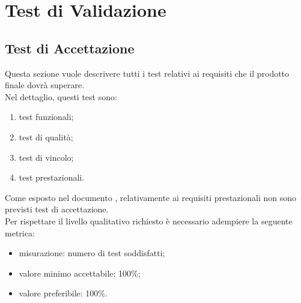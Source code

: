 \section{Test di Validazione}

\subsection{Test di Accettazione}
	Questa sezione vuole descrivere tutti i test relativi ai requisiti che il prodotto finale dovrà superare.\\
	Nel dettaglio, questi test sono:
	\begin{enumerate}
		\item test funzionali;
		\item test di qualità;
		\item test di vincolo;
		\item test prestazionali.
	\end{enumerate}
	Come esposto nel documento \AdR{}, relativamente ai requisiti prestazionali non sono previsti test di accettazione. \\
	Per rispettare il livello qualitativo richiesto è necessario adempiere la seguente metrica:
	\begin{itemize}
		\item{misurazione: numero di test soddisfatti;}
		\item{valore minimo accettabile: 100\%;}
		\item{valore preferibile: 100\%.}
	\end{itemize}